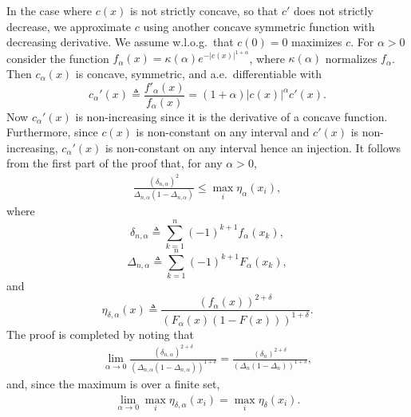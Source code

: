 \begin{proof-of-lemma}[\ref{lem:bound_intervals_delta}]
  In the case where $c(x)$ is not strictly concave, so that $c'$ does not
  strictly decrease, we approximate $c$ using another concave symmetric
  function with decreasing derivative. We assume w.l.o.g.\ that $c(0) = 0$
  maximizes $c$.  For $\alpha>0$ consider the function $f_\alpha(x) =
  \kappa(\alpha) e^{-|c(x)|^{1+\alpha}}$, where $\kappa(\alpha)$ normalizes
  $f_\alpha$.  Then $c_\alpha(x)$ is concave, symmetric, and
  a.e.\ differentiable with
  \begin{equation*}
    c_\alpha'(x) \triangleq \frac{f'_\alpha(x)}{f_\alpha(x)} = (1+\alpha)|c(x)|^{\alpha} c'(x). 
  \end{equation*}
  Now $c_\alpha'(x)$ is non-increasing since it is the derivative of a concave
  function. Furthermore, since $c(x)$ is non-constant on any interval and
  $c'(x)$ is non-increasing, $c_\alpha'(x)$ is non-constant on any interval
  hence an injection. It follows from the first part of the proof that, for
  any $\alpha>0$,
  \begin{align}
    \label{eq:proof:lem:bound_intervals}
    \frac{(\delta_{n,\alpha})^2}{\Delta_{n,\alpha}(1-\Delta_{n,\alpha})} \leq \max_i \eta_{\alpha}(x_i),
  \end{align}
  where 
  \begin{equation*}
    \delta_{n,\alpha} \triangleq  \sum_{k=1}^{n} (-1)^{k+1} f_{\alpha}(x_k),
  \end{equation*}
  \begin{equation*}
    \Delta_{n,\alpha} \triangleq \sum_{k=1}^n (-1)^{k+1} F_{\alpha}(x_k), 
  \end{equation*}
  and 
  \begin{equation*}
    \eta_{\delta,\alpha}(x) \triangleq \frac{(f_\alpha(x))^{2+\delta}}{\left(F_{\alpha}(x)(1-F(x)) \right)^{1+\delta}}. 
  \end{equation*}
  The proof is completed by noting that 
  \begin{align*}
    \lim_{\alpha \to 0} \frac{(\delta_{n,\alpha})^{2+\delta} }{ \left(\Delta_{n,\alpha}(1-\Delta_{n,\alpha})\right)^{1+\delta}}  = \frac{(\delta_{n})^{2+\delta }}{\left(\Delta_{n}(1-\Delta_{n}) \right)^{1+\delta}},  
  \end{align*}
  and, since the maximum is over a finite set,
  \begin{align*}
    \lim_{\alpha \to 0}  \max_i \eta_{\delta,\alpha}(x_i)  = \max_i\eta_\delta(x_i).
  \end{align*}


\end{proof-of-lemma}
